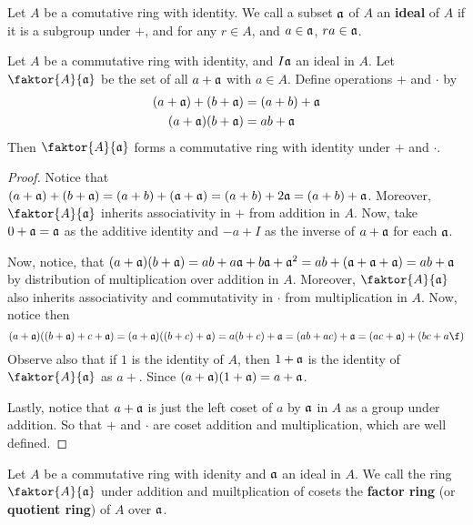\begin{definition}
    Let $A$ be a comutative ring with identity. We call a subset $\mathfrak{a}$ of $A$ an
    \textbf{ideal} of $A$ if it is a subgroup under $+$, and for any $r \in A$,
    and  $a \in \mathfrak{a}$,  $ra \in \mathfrak{a}$.
\end{definition}

\begin{theorem}\label{1.3.3}
    Let $A$ be a commutative ring with identity, and $I\mathfrak{a}$ an ideal in $A$.
    Let  $\faktor{A}{\af}$ be the set
    of all $a+\mathfrak{a}$ with  $a \in A$. Define operations $+$ and $\cdot$ by
    \begin{align*}
        (a+\mathfrak{a})+(b+\mathfrak{a}) &=  (a+b)+\mathfrak{a} \\
        (a+\mathfrak{a})(b+\mathfrak{a})  &=  ab+\mathfrak{a}    \\
    \end{align*}
    Then $\faktor{A}{\af}$ forms a commutative ring with identity under  $+$ and
    $\cdot$.
\end{theorem}
\begin{proof}
    Notice that $(a+\mathfrak{a})+(b+\mathfrak{a})=(a+b)+(\mathfrak{a}+\mathfrak{a})=(a+b)+2\mathfrak{a}=(a+b)+\mathfrak{a}$. Moreover,
    $\faktor{A}{\af}$ inherits associativity in $+$ from addition in $A$. Now,
    take $0+\mathfrak{a}=\mathfrak{a}$ as the additive identity and  $-a+I$ as the inverse of
    $a+\mathfrak{a}$ for each $\mathfrak{a}$.

    Now, notice, that $(a+\mathfrak{a})(b+\mathfrak{a})=ab+a\mathfrak{a}+b\mathfrak{a}+\mathfrak{a}^2=ab+(\mathfrak{a}+\mathfrak{a}+\mathfrak{a})=
    ab+\mathfrak{a}$ by distribution of multiplication over addition in $A$. Moreover,
    $\faktor{A}{\af}$ also inherits associativity and commutativity in $\cdot$
    from multiplication in $A$. Now, notice then
    \begin{equation*}
        (a+\af)((b+\af)+c+\af)=(a+\af)((b+c)+\af)=a(b+c)+\af=(ab+ac)+\af=
        (ac+\af)+(bc+a\f)
    \end{equation*}
    Observe also that if $1$ is the identity of $A$, then $1+\mathfrak{a}$ is the
    identity of  $\faktor{A}{\af}$ as $a+$. Since $(a+\mathfrak{a})(1+\mathfrak{a})=a+\mathfrak{a}$.

    Lastly, notice that $a+\mathfrak{a}$ is just the left coset of  $a$ by  $\mathfrak{a}$ in $A$ as a
    group under addition. So that $+$ and  $\cdot$ are coset addition and
    multiplication, which are well defined.
\end{proof}

\begin{definition}
    Let $A$ be a commutative ring with idenity and $\mathfrak{a}$ an ideal in $A$. We
    call the ring $\faktor{A}{\af}$ under addition and muiltplication of cosets
    the \textbf{factor ring} (or \textbf{quotient ring}) of $A$ over  $\mathfrak{a}$.
\end{definition}

